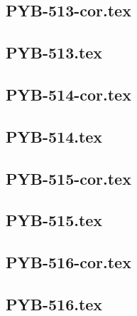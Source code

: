 \renewcommand{\xxexo}{PYB-513-cor.tex} 
\subsection*{\xxexo} 
\graphicspath{{../../exospython_bases/equadiffs/\xxexo/}}
 
 
\renewcommand{\xxexo}{PYB-513.tex} 
\subsection*{\xxexo} 
\graphicspath{{../../exospython_bases/equadiffs/\xxexo/}}
 
 
\renewcommand{\xxexo}{PYB-514-cor.tex} 
\subsection*{\xxexo} 
\graphicspath{{../../exospython_bases/equadiffs/\xxexo/}}
 
 
\renewcommand{\xxexo}{PYB-514.tex} 
\subsection*{\xxexo} 
\graphicspath{{../../exospython_bases/equadiffs/\xxexo/}}
 
 
\renewcommand{\xxexo}{PYB-515-cor.tex} 
\subsection*{\xxexo} 
\graphicspath{{../../exospython_bases/equadiffs/\xxexo/}}
 
 
\renewcommand{\xxexo}{PYB-515.tex} 
\subsection*{\xxexo} 
\graphicspath{{../../exospython_bases/equadiffs/\xxexo/}}
 
 
\renewcommand{\xxexo}{PYB-516-cor.tex} 
\subsection*{\xxexo} 
\graphicspath{{../../exospython_bases/equadiffs/\xxexo/}}
 
 
\renewcommand{\xxexo}{PYB-516.tex} 
\subsection*{\xxexo} 
\graphicspath{{../../exospython_bases/equadiffs/\xxexo/}}
 
 
